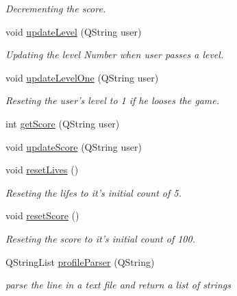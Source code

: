 \begin{DoxyCompactItemize}
\begin{DoxyCompactList}\small\item\em Decrementing the score. \end{DoxyCompactList}\item 
void \hyperlink{classlevels_a34d3e8e41addbd72aa48e1a9000f8fdd}{update\-Level} (Q\-String user)
\begin{DoxyCompactList}\small\item\em Updating the level Number when user passes a level. \end{DoxyCompactList}\item 
void \hyperlink{classlevels_ac87ef97458bf84ba939ec0e06833a0fc}{update\-Level\-One} (Q\-String user)
\begin{DoxyCompactList}\small\item\em Reseting the user's level to 1 if he looses the game. \end{DoxyCompactList}\item 
int \hyperlink{classlevels_afbaaf65ea0eec78856a2844a5f2effb6}{get\-Score} (Q\-String user)
\item 
void \hyperlink{classlevels_ad768338c2e60e0a55ad8655ae44e3d4f}{update\-Score} (Q\-String user)
\item 
void \hyperlink{classlevels_ab33b252392e1de5318895f306ff30be6}{reset\-Lives} ()
\begin{DoxyCompactList}\small\item\em Reseting the lifes to it's initial count of 5. \end{DoxyCompactList}\item 
\hypertarget{classlevels_a17d7e0f2c9a88471180b352bd7c7885e}{void \hyperlink{classlevels_a17d7e0f2c9a88471180b352bd7c7885e}{reset\-Score} ()}\label{classlevels_a17d7e0f2c9a88471180b352bd7c7885e}

\begin{DoxyCompactList}\small\item\em Reseting the score to it's initial count of 100. \end{DoxyCompactList}\item 
Q\-String\-List \hyperlink{classlevels_ac405da2d15ad7eb0db63b841ec243ad4}{profile\-Parser} (Q\-String)
\begin{DoxyCompactList}\small\item\em parse the line in a text file and return a list of strings \end{DoxyCompactList}\end{DoxyCompactItemize}

